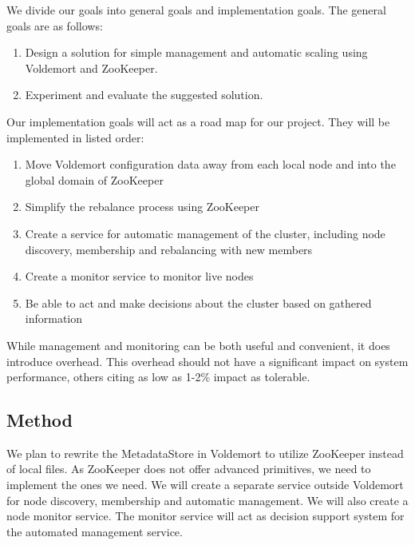 We divide our goals into general goals and implementation goals. The general goals are as follows: 

\begin{enumerate}
	\item{Design a solution for simple management and automatic scaling using Voldemort and ZooKeeper.}
	\item{Experiment and evaluate the suggested solution.}
\end{enumerate}

Our implementation goals will act as a road map for our project. They will be implemented in listed order:

\begin{enumerate}
	\item{Move Voldemort configuration data away from each local node and into the global domain of ZooKeeper}
	\item{Simplify the rebalance process using ZooKeeper}
	\item{Create a service for automatic management of the cluster, including node discovery, membership and rebalancing with new members}
	\item{Create a monitor service to monitor live nodes}
	\item{Be able to act and make decisions about the cluster based on gathered information}
\end{enumerate}

While management and monitoring can be both useful and convenient, it does introduce overhead. This overhead should not have a significant impact on system performance, others citing as low as 1-2\% impact as tolerable\cite{Rabl:2012:SBD:2367502.2367512}.

\subsection{Method}
We plan to rewrite the MetadataStore in Voldemort to utilize ZooKeeper instead of local files. As ZooKeeper does not offer advanced primitives, we need to implement the ones we need. We will create a separate service outside Voldemort for node discovery, membership and automatic management. We will also create a node monitor service. The monitor service will act as decision support system for the automated management service. 



